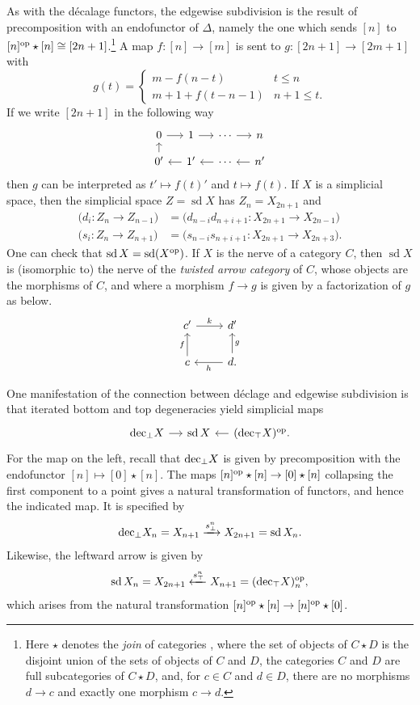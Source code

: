 \documentclass{amsart}
\theoremstyle{definition}
\theoremstyle{remark}
\newcommand{\op}{\textup{op}}
\newcommand{\udec}{\textup{dec}_{\top}}
\newcommand{\ldec}{\textup{dec}_{\perp}}
\DeclareMathOperator{\sd}{sd}
\begin{document}
As with the d\'ecalage functors, the edgewise subdivision is the result of precomposition with an endofunctor of $\Delta$, namely the one which sends $[n]$ to $[n]^\op \star [n] \cong [2n+1]$.\footnote{
Here $\star$ denotes the \emph{join} of categories \cite[\href{https://kerodon.net/tag/0160}{Tag 0160}]{kerodon}, where the set of objects of $C \star D$ is the disjoint union of the sets of objects of $C$ and $D$, the categories $C$ and $D$ are full subcategories of $C\star D$, and, for $c\in C$ and $d\in D$, there are no morphisms $d\to c$ and exactly one morphism $c\to d$.}
A map $f \colon [n] \to [m]$ is sent to $g \colon [2n+1] \to [2m+1]$ with
\[
g(t) = \begin{cases}
m - f(n-t) & t \leq n \\
m+1 + f(t-n-1) & n+1 \leq t.
\end{cases}
\]
If we write $[2n+1]$ in the following way
\[
\begin{tikzcd}[sep=small]
  0 \rar & 1 \rar & \cdots \rar & n \\
  0' \uar & 1' \lar & \cdots \lar & n' \lar
\end{tikzcd}
\]
then $g$ can be interpreted as $t' \mapsto f(t)'$ and $t \mapsto f(t)$.
If $X$ is a simplicial space, then the simplicial space $Z = \sd X$ has $Z_n = X_{2n+1}$ and
\begin{align*}
  \big(d_i \colon Z_n \to Z_{n-1}\big) &= \big(d_{n-i} d_{n+i+1} \colon X_{2n+1} \to X_{2n-1}\big) \\
  \big(s_i \colon Z_n \to Z_{n+1}\big) &= \big(s_{n-i} s_{n+i+1} \colon X_{2n+1} \to X_{2n+3}\big).
\end{align*}
One can check that $\sd X = \sd (X^\op)$. %
If $X$ is the nerve of a category $C$, then $\sd X$ is (isomorphic to) the nerve of the \emph{twisted arrow category} of $C$, whose objects are the morphisms of $C$, and where a morphism $f \to g$ is given by a factorization of $g$ as below.
\[
\begin{tikzcd}  
  c' \rar{k} & d' \\
  c \uar{f} & d \lar{h} \uar[swap]{g}.
\end{tikzcd}
\]

One manifestation of the connection between d\'eclage and edgewise subdivision is that iterated bottom and top degeneracies yield simplicial maps
\[ \begin{tikzcd}[sep=small]
\ldec X \rar & \sd X & (\udec X)^\op. \lar
\end{tikzcd} \]
For the map on the left, recall that $\ldec X$ is given by precomposition with the endofunctor $[n] \mapsto [0] \star [n]$. 
The maps $[n]^\op \star [n] \to [0] \star [n]$ collapsing the first component to a point gives a natural transformation of functors, and hence the indicated map.
It is specified by
\begin{equation}\label{eq ldec to sd}
  \ldec X_n = X_{n+1} \xrightarrow{s_\bot^n} X_{2n+1} = \sd X_n.
\end{equation}
Likewise, the leftward arrow is given by
\[
  \sd X_n = X_{2n+1} \xleftarrow{s_\top^n} X_{n+1} = (\udec X)^\op_n,
\]
which arises from the natural transformation $[n]^\op \star [n] \to [n]^\op \star [0]$.
\end{document}
